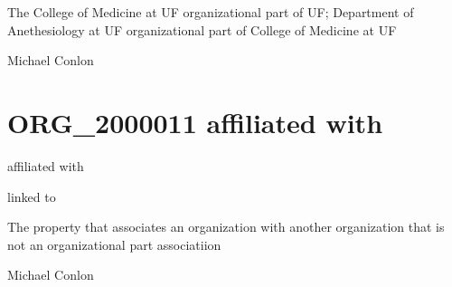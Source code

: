\documentclass[letterpaper,10pt,english]{sphinxmanual}
\begin{document}
\begin{sphinxShadowBox}

\sphinxAtStartPar
The College of Medicine at UF organizational part of UF; Department of Anethesiology at UF organizational part of College of Medicine at UF
\end{sphinxShadowBox}

\begin{sphinxShadowBox}

\sphinxAtStartPar
Michael Conlon 
\end{sphinxShadowBox}
\begin{quote}
\label{\detokenize{doc-ORG_2000011:org-2000011}}\label{\detokenize{doc-ORG_2000011:affiliated-with}}\label{\detokenize{doc-ORG_2000011:org-2000011}}
\ignorespaces \end{quote}


\section{ORG\_2000011 \sphinxhyphen{} affiliated with}
\label{\detokenize{doc-ORG_2000011:org-2000011-affiliated-with}}\label{\detokenize{doc-ORG_2000011:index-0}}\label{\detokenize{doc-ORG_2000011::doc}}
\begin{sphinxShadowBox}

\sphinxAtStartPar
affiliated with
\end{sphinxShadowBox}

\begin{sphinxShadowBox}

\sphinxAtStartPar
linked to
\end{sphinxShadowBox}

\begin{sphinxShadowBox}

\sphinxAtStartPar
The property that associates an organization with another organization that is not an organizational part associatiion
\end{sphinxShadowBox}

\begin{sphinxShadowBox}

\sphinxAtStartPar
Michael Conlon 
\end{sphinxShadowBox}
\end{document}
